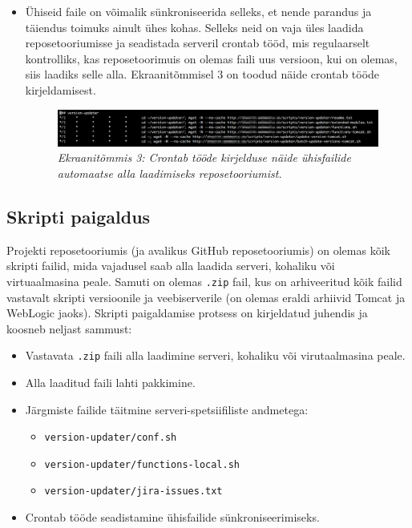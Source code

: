 \documentclass[12pt]{report}
\newcommand{\code}[1]{\texttt{#1}}
\begin{document}
\begin{itemize}
   \item Ühiseid faile on võimalik sünkroniseerida selleks, et nende parandus ja täiendus toimuks ainult ühes kohas. Selleks neid on vaja üles laadida reposetooriumisse ja seadistada serveril crontab \cite{cron} tööd, mis regulaarselt kontrolliks, kas reposetoorimuis on olemas faili uus versioon, kui on olemas, siis laadiks selle alla. Ekraanitõmmisel 3 on toodud näide crontab tööde kirjeldamisest.
   \begin{figure}[H]
     \begin{center} 
       \includegraphics[width=.75\textwidth]{screenshots/crontab.png}
       \caption*{\textit{Ekraanitõmmis 3: Crontab tööde kirjelduse näide ühisfailide automaatse alla laadimiseks reposetooriumist.}}
     \end{center}
   \end{figure}
 \end{itemize}

  \subsection{Skripti paigaldus}
  
  Projekti reposetooriumis (ja avalikus GitHub reposetooriumis) on olemas kõik skripti failid, mida vajadusel saab alla laadida serveri, kohaliku või virtuaalmasina peale. Samuti on olemas \code{.zip} fail, kus on arhiveeritud kõik failid vastavalt skripti versioonile ja veebiserverile (on olemas eraldi arhiivid Tomcat ja WebLogic jaoks). Skripti paigaldamise protsess on kirjeldatud juhendis ja koosneb neljast sammust:
  \begin{itemize}
    \item Vastavata \code{.zip} faili alla laadimine serveri, kohaliku või virutaalmasina peale.
    \item Alla laaditud faili lahti pakkimine.
    \item Järgmiste failide täitmine serveri-spetsiifiliste andmetega:
    \begin{itemize}
      \item \code{version-updater/conf.sh}
      \item \code{version-updater/functions-local.sh}
      \item \code{version-updater/jira-issues.txt}
    \end{itemize}
    \item Crontab tööde seadistamine ühisfailide sünkroniseerimiseks.
  \end{itemize}
  
\end{document}
